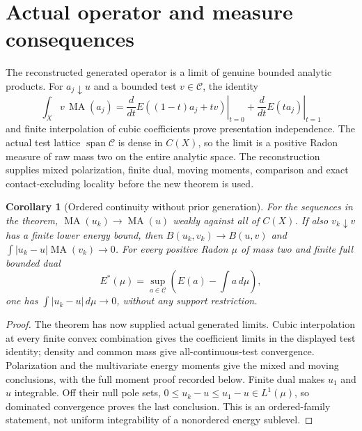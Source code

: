 \documentclass[11pt]{article}
\newtheorem{corollary}[theorem]{Corollary}
\newcommand{\C}{\mathcal C}
\newcommand{\MA}{\operatorname{MA}}
\begin{document}
\section*{Actual operator and measure consequences}
The reconstructed generated operator is a limit of genuine bounded analytic
products. For $a_j\downarrow u$ and a bounded test $v\in\C$, the identity
\[
 \int_Xv\,\MA(a_j)
 =\left.\frac{d}{dt}E((1-t)a_j+tv)\right|_{t=0}
  +\left.\frac{d}{dt}E(ta_j)\right|_{t=1}
\]
and finite interpolation of cubic coefficients prove presentation independence.
The actual test lattice $\operatorname{span}\C$ is dense in $C(X)$, so the
limit is a positive Radon measure of raw mass two on the entire analytic space.
The reconstruction supplies mixed polarization, finite dual, moving moments,
comparison and exact contact-excluding locality before the new theorem is used.

\begin{corollary}[Ordered continuity without prior generation]
For the sequences in the theorem, $\MA(u_k)\to\MA(u)$ weakly against all
of $C(X)$. If also $v_k\downarrow v$ has a finite lower energy bound, then
$B(u_k,v_k)\to B(u,v)$ and
$\int|u_k-u|\MA(v_k)\to0$.
For every positive Radon $\mu$ of mass two and finite full bounded dual
\[
 E^*(\mu)=\sup_{a\in\C}\left(E(a)-\int a\,d\mu\right),
\]
one has $\int|u_k-u|\,d\mu\to0$, without any support restriction.
\end{corollary}
\begin{proof}
The theorem has now supplied actual generated limits. Cubic interpolation at
every finite convex combination gives the coefficient limits in the displayed
test identity; density and common mass give all-continuous-test convergence.
Polarization and the multivariate energy moments give the mixed and moving
conclusions, with the full moment proof recorded below. Finite dual makes
$u_1$ and $u$ integrable. Off their null pole sets,
$0\leq u_k-u\leq u_1-u\in L^1(\mu)$, so dominated convergence proves the
last conclusion. This is an ordered-family statement, not uniform
integrability of a nonordered energy sublevel.
\end{proof}
\end{document}
